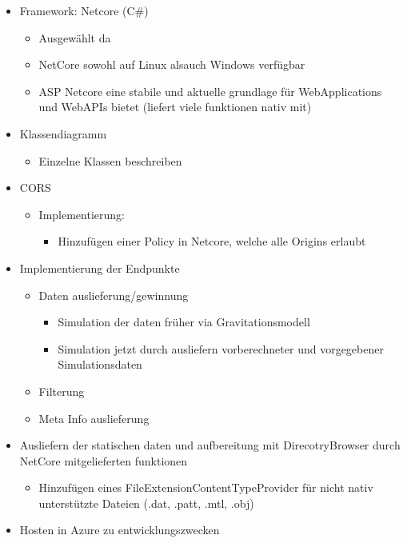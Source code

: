 \begin{itemize}
	\item Framework: Netcore (C\#)
	\begin{itemize}
		\item Ausgewählt da
		\item NetCore sowohl auf Linux alsauch Windows verfügbar
		\item ASP Netcore eine stabile und aktuelle grundlage für WebApplications und WebAPIs bietet (liefert viele funktionen nativ mit)
	\end{itemize}
	
	\item Klassendiagramm
	\begin{itemize}
		\item Einzelne Klassen beschreiben
	\end{itemize}
		
	\item CORS
	\begin{itemize}
		\item Implementierung:
		\begin{itemize}
			\item Hinzufügen einer Policy in Netcore, welche alle Origins erlaubt
		\end{itemize}
	\end{itemize}
	
	\item Implementierung der Endpunkte
	\begin{itemize}
		\item Daten auslieferung/gewinnung
		\begin{itemize}
			\item Simulation der daten früher via Gravitationsmodell
			\item Simulation jetzt durch ausliefern vorberechneter und vorgegebener Simulationsdaten
		\end{itemize}
				
		\item Filterung
		\item Meta Info auslieferung
	\end{itemize}
		
	\item Ausliefern der statischen daten und aufbereitung mit DirecotryBrowser durch NetCore mitgelieferten funktionen
	\begin{itemize}	
		\item Hinzufügen eines FileExtensionContentTypeProvider für nicht nativ unterstützte Dateien (.dat, .patt, .mtl, .obj)
	\end{itemize}
		
	\item Hosten in Azure zu entwicklungszwecken
\end{itemize}


